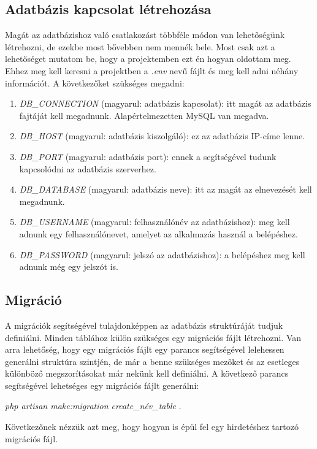 \documentclass[]{thesis-ekf}
\theoremstyle{definition}
\theoremstyle{remark}
\begin{document}
	\subsection{Adatbázis kapcsolat létrehozása}
		Magát az adatbázishoz való csatlakozást többféle módon van lehetőségünk létrehozni, de ezekbe most bővebben nem mennék bele. Most csak azt a lehetőséget mutatom be, hogy a projektemben ezt én hogyan oldottam meg. Ehhez meg kell keresni a projektben a \emph{.env} nevű fájlt és meg kell adni néhány információt. A következőket szükséges megadni:
		\begin{enumerate}
			\item \emph{DB\_CONNECTION} (magyarul: adatbázis kapcsolat): itt magát az adatbázis fajtáját kell megadnunk. Alapértelmezetten MySQL van megadva. 
			\item \emph{DB\_HOST} (magyarul: adatbázis kiszolgáló): ez az adatbázis IP-címe lenne.
			\item \emph{DB\_PORT} (magyarul: adatbázis port): ennek a segítségével tudunk kapcsolódni az adatbázis szerverhez. 
			\item \emph{DB\_DATABASE} (magyarul: adatbázis neve): itt az magát az elnevezését kell megadnunk.
			\item \emph{DB\_USERNAME} (magyarul: felhasználónév az adatbázishoz): meg kell adnunk egy felhasználónevet, amelyet az alkalmazás használ a belépéshez.
			\item \emph{DB\_PASSWORD} (magyarul: jelszó az adatbázishoz): a belépéshez meg kell adnunk még egy jelszót is.
		\end{enumerate}
	\subsection{Migráció}\label{sb-migracio}
		A migrációk segítségével tulajdonképpen az adatbázis struktúráját tudjuk definiálni. Minden táblához külön szükséges egy migrációs fájlt létrehozni. Van arra lehetőség, hogy egy migrációs fájlt egy parancs segítségével lelehessen generálni struktúra szintjén, de már a benne szükséges mezőket és az esetleges különböző megszorításokat már nekünk kell definiálni. A következő parancs segítségével lehetséges egy migrációs fájlt generálni:
		\begin{center} 
			\emph{php artisan make:migration create\_név\_table} .
		\end{center}
		Következőnek nézzük azt meg, hogy hogyan is épül fel egy hirdetéshez tartozó migrációs fájl.
	
		
		
\end{document}
